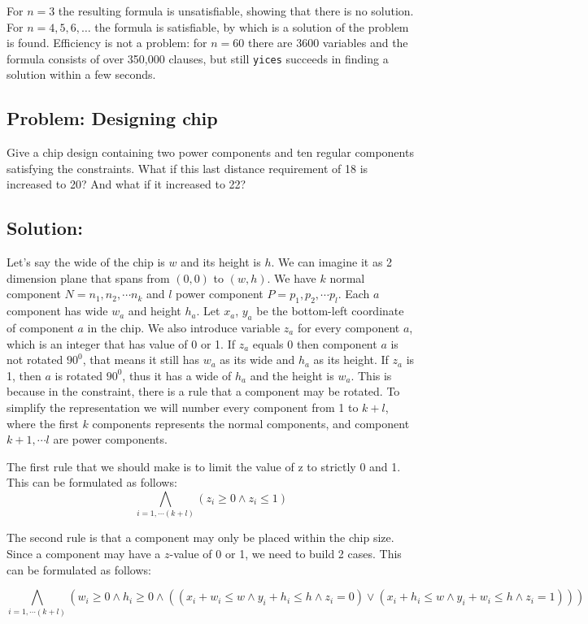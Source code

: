 \documentclass[12pt]{article}
\begin{document}
For $n=3$ the resulting formula is unsatisfiable, showing that
there is no solution. For $n = 4,5,6,\ldots$ the formula is
satisfiable, by which is a solution of the problem is found.
Efficiency is not a problem: for $n = 60$ there are 3600
variables and the formula consists of over 350,000 clauses, but 
still {\tt yices} succeeds in finding a solution within a few
seconds.

\subsection*{Problem: Designing chip}
Give a chip design containing two power components and ten
regular components satisfying the constraints. What if this last distance requirement of 18 is increased to 20? And what if it increased to 22? 

\subsection*{Solution:}
Let's say the wide of the chip is $w$ and its height is $h$. We can imagine it as 2 dimension plane that spans from $(0,0)$ to $(w,h)$. We have $k$ normal component $N=n_1, n_2, \cdots n_k$ and $l$ power component $P=p_1, p_2, \cdots p_l$. Each $a$ component has wide $w_a$ and height $h_a$. Let $x_a$, $y_a$ be the bottom-left coordinate of component $a$ in the chip. We also introduce variable $z_a$ for every component $a$, which is an integer that has value of 0 or 1. If $z_a$ equals 0 then component $a$ is not rotated $90^0$, that means it still has $w_a$ as its wide and $h_a$ as its height. If $z_a$ is 1, then $a$ is rotated $90^0$, thus it has a wide of $h_a$ and the height is $w_a$. This is because in the constraint, there is a rule that a component may be rotated. To simplify the representation we will number every component from 1 to $k+l$, where the first $k$ components represents the normal components, and component $k+1, \cdots l$ are power components.

The first rule that we should make is to limit the value of z to strictly 0 and 1. This can be formulated as follows:
\[ \bigwedge_{i=1,\cdots (k+l)} {(z_i \geq 0 \wedge z_i \leq 1)} \]

The second rule is that a component may only be placed within the chip size. Since a component may have a $z$-value of 0 or 1, we need to build 2 cases. This can be formulated as follows: 

\[ \bigwedge_{i=1,\cdots (k+l)} {(w_i \geq 0 \wedge h_i \geq 0 \wedge ((x_i+w_i \leq w \wedge y_i+h_i \leq h \wedge z_i=0) \vee (x_i+h_i \leq w \wedge y_i+w_i \leq h \wedge z_i=1)))} \]
\end{document}
